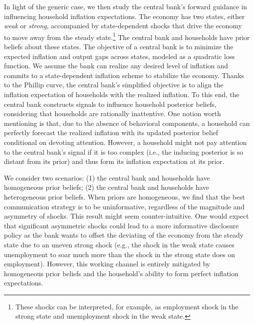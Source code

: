 \documentclass[12pt,a4paper]{article}
\begin{document}
In light of the generic case, we then study the central bank's forward guidance in influencing household inflation expectations. The economy has two states, either \textit{weak} or \textit{strong}, accompanied by state-dependent shocks that drive the economy to move away from the steady state.\footnote{These shocks can be interpreted, for example, as employment shock in the strong state and unemployment shock in the weak state.} The central bank and households have prior beliefs about these states. The objective of a central bank is to minimize the expected inflation and output gaps across states, modeled as a quadratic loss function. We assume the bank can realize any desired level of inflation and commits to a state-dependent inflation scheme to stabilize the economy. Thanks to the Phillip curve, the central bank's simplified objective is to align the inflation expectation of households with the realized inflation. To this end, the central bank constructs signals to influence household posterior beliefs, considering that households are rationally inattentive. One notion worth mentioning is that, due to the absence of behavioral components, a household can perfectly forecast the realized inflation with its updated posterior belief conditional on devoting attention. However, a household might not pay attention to the central bank's signal if it is too complex (i.e., the inducing posterior is so distant from its prior) and thus form its inflation expectation at its prior.

We consider two scenarios: (1) the central bank and households have homogeneous prior beliefs; (2) the central bank and households have heterogeneous prior beliefs. When priors are homogeneous, we find that the best communication strategy is to be uninformative, regardless of the magnitude and asymmetry of shocks. This result might seem counter-intuitive. One would expect that significant asymmetric shocks could lead to a more informative disclosure policy as the bank wants to offset the deviating of the economy from the steady state due to an uneven strong shock (e.g., the shock in the weak state causes unemployment to soar much more than the shock in the strong state does on employment). However, this working channel is entirely mitigated by homogeneous prior beliefs and the household's ability to form perfect inflation expectations.
\end{document}
